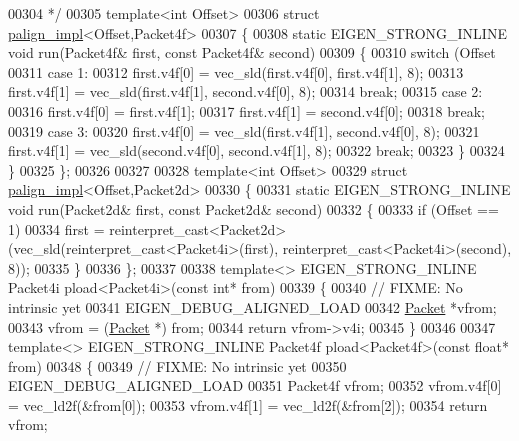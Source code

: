 \begin{DoxyCode}
{00304 \textcolor{comment}{ */}
00305 \textcolor{keyword}{template}<\textcolor{keywordtype}{int} Offset>
00306 \textcolor{keyword}{struct }\hyperlink{struct_eigen_1_1internal_1_1palign__impl}{palign\_impl}<Offset,Packet4f>
00307 \{
00308   \textcolor{keyword}{static} EIGEN\_STRONG\_INLINE \textcolor{keywordtype}{void} run(Packet4f& first, \textcolor{keyword}{const} Packet4f& second)
00309   \{
00310     \textcolor{keywordflow}{switch} (Offset %
00311     \textcolor{keywordflow}{case} 1:
00312       first.v4f[0] = vec\_sld(first.v4f[0], first.v4f[1], 8);
00313       first.v4f[1] = vec\_sld(first.v4f[1], second.v4f[0], 8);
00314       \textcolor{keywordflow}{break};
00315     \textcolor{keywordflow}{case} 2:
00316       first.v4f[0] = first.v4f[1];
00317       first.v4f[1] = second.v4f[0];
00318       \textcolor{keywordflow}{break};
00319     \textcolor{keywordflow}{case} 3:
00320       first.v4f[0] = vec\_sld(first.v4f[1],  second.v4f[0], 8);
00321       first.v4f[1] = vec\_sld(second.v4f[0], second.v4f[1], 8);
00322       \textcolor{keywordflow}{break};
00323     \}
00324   \}
00325 \};
00326 
00327 
00328 \textcolor{keyword}{template}<\textcolor{keywordtype}{int} Offset>
00329 \textcolor{keyword}{struct }\hyperlink{struct_eigen_1_1internal_1_1palign__impl}{palign\_impl}<Offset,Packet2d>
00330 \{
00331   \textcolor{keyword}{static} EIGEN\_STRONG\_INLINE \textcolor{keywordtype}{void} run(Packet2d& first, \textcolor{keyword}{const} Packet2d& second)
00332   \{
00333     \textcolor{keywordflow}{if} (Offset == 1)
00334       first = \textcolor{keyword}{reinterpret\_cast<}Packet2d\textcolor{keyword}{>}(vec\_sld(reinterpret\_cast<Packet4i>(first), 
      reinterpret\_cast<Packet4i>(second), 8));
00335   \}
00336 \};
00337 
00338 \textcolor{keyword}{template}<> EIGEN\_STRONG\_INLINE Packet4i pload<Packet4i>(\textcolor{keyword}{const} \textcolor{keywordtype}{int}*     from)
00339 \{
00340   \textcolor{comment}{// FIXME: No intrinsic yet}
00341   EIGEN\_DEBUG\_ALIGNED\_LOAD
00342   \hyperlink{union_eigen_1_1internal_1_1_packet}{Packet} *vfrom;
00343   vfrom = (\hyperlink{union_eigen_1_1internal_1_1_packet}{Packet} *) from;
00344   \textcolor{keywordflow}{return} vfrom->v4i;
00345 \}
00346 
00347 \textcolor{keyword}{template}<> EIGEN\_STRONG\_INLINE Packet4f pload<Packet4f>(\textcolor{keyword}{const} \textcolor{keywordtype}{float}*   from)
00348 \{
00349   \textcolor{comment}{// FIXME: No intrinsic yet}
00350   EIGEN\_DEBUG\_ALIGNED\_LOAD
00351   Packet4f vfrom;
00352   vfrom.v4f[0] = vec\_ld2f(&from[0]);
00353   vfrom.v4f[1] = vec\_ld2f(&from[2]);
00354   \textcolor{keywordflow}{return} vfrom;
}
\end{DoxyCode}
